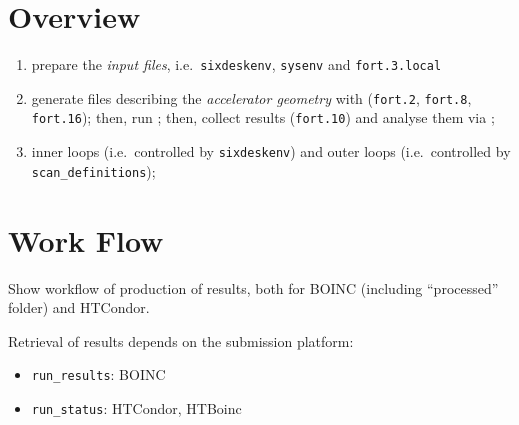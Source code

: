 \section{Overview} \label{Overview}
\begin{enumerate}
\item prepare the \emph{input files}, i.e.~\texttt{sixdeskenv},
\texttt{sysenv} and \texttt{fort.3.local}
\item generate files describing the \emph{accelerator geometry}
  with \MADX{} (\texttt{fort.2}, \texttt{fort.8},
  \texttt{fort.16}); then, run \SIXTRACK{}; then, collect results
  (\texttt{fort.10}) and analyse them via \SIXDB{};
\item inner loops (i.e.~controlled by \texttt{sixdeskenv}) and outer loops
  (i.e.~controlled by \texttt{scan\_definitions});
\end{enumerate}

\section{Work Flow}
Show workflow of production of results, both for BOINC (including ``processed''
folder) and HTCondor.

Retrieval of results depends on the submission platform:
\begin{itemize}
\item \texttt{run\_results}: BOINC
\item \texttt{run\_status}: HTCondor, HTBoinc
\end{itemize}

